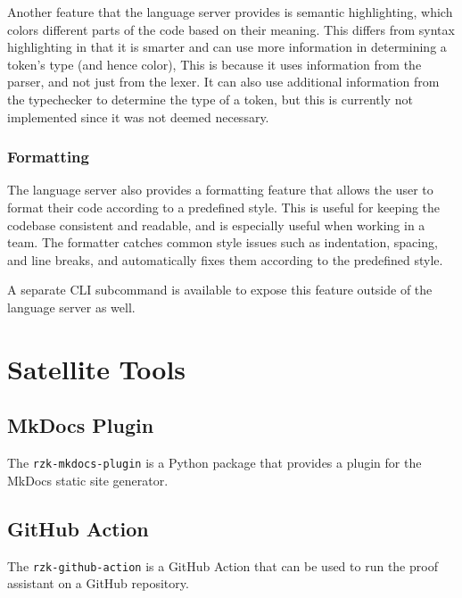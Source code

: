 Another feature that the language server provides is semantic highlighting, which colors different parts of the code
based on their meaning.
This differs from syntax highlighting in that it is smarter and can use more information in determining a token's type (and hence color),
This is because it uses information from the parser, and not just from the lexer.
It can also use additional information from the typechecker to determine the type of a token,
but this is currently not implemented since it was not deemed necessary.

\subsubsection{Formatting}

The language server also provides a formatting feature that allows the user to format their code according to a predefined style.
This is useful for keeping the codebase consistent and readable, and is especially useful when working in a team.
The formatter catches common style issues such as indentation, spacing, and line breaks,
and automatically fixes them according to the predefined style.

A separate CLI subcommand is available to expose this feature outside of the language server as well.

\section{Satellite Tools}


\subsection{MkDocs Plugin}

The \texttt{rzk-mkdocs-plugin} is a Python package that provides a plugin for the MkDocs static site generator.

\subsection{GitHub Action}

The \texttt{rzk-github-action} is a GitHub Action that can be used to run the \Rzk{} proof assistant on a GitHub repository.
